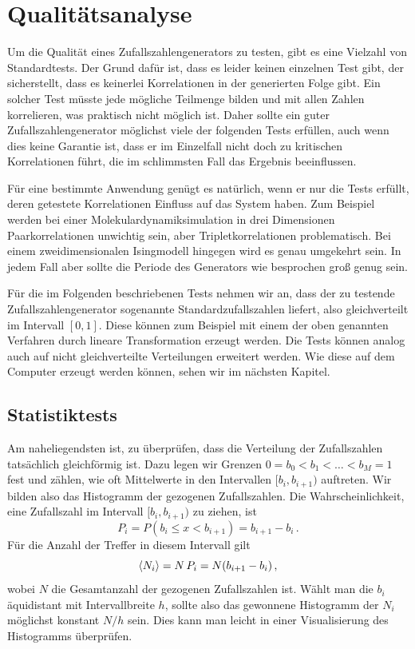 \section{Qualitätsanalyse}

Um die Qualität eines Zufallszahlengenerators zu testen, gibt es eine
Vielzahl von Standardtests. Der Grund dafür ist, dass es leider keinen
einzelnen Test gibt, der sicherstellt, dass es keinerlei Korrelationen
in der generierten Folge gibt. Ein solcher Test müsste jede mögliche
Teilmenge bilden und mit allen Zahlen korrelieren, was praktisch nicht
möglich ist. Daher sollte ein guter Zufallszahlengenerator möglichst
viele der folgenden Tests erfüllen, auch wenn dies keine Garantie ist,
dass er im Einzelfall nicht doch zu kritischen Korrelationen führt,
die im schlimmsten Fall das Ergebnis beeinflussen.

Für eine bestimmte Anwendung genügt es natürlich, wenn er nur die
Tests erfüllt, deren getestete Korrelationen Einfluss auf das System
haben. Zum Beispiel werden bei einer Molekulardynamiksimulation in
drei Dimensionen Paarkorrelationen unwichtig sein, aber
Tripletkorrelationen problematisch.  Bei einem zweidimensionalen
Isingmodell hingegen wird es genau umgekehrt sein.  In jedem Fall aber
sollte die Periode des Generators wie besprochen groß genug sein.

Für die im Folgenden beschriebenen Tests nehmen wir an, dass der zu
testende Zufallszahlengenerator sogenannte Standardzufallszahlen
liefert, also gleichverteilt im Intervall $[0,1]$. Diese können zum
Beispiel mit einem der oben genannten Verfahren durch lineare
Transformation erzeugt werden. Die Tests können analog auch auf nicht
gleichverteilte Verteilungen erweitert werden. Wie diese auf dem
Computer erzeugt werden können, sehen wir im nächsten Kapitel.

\subsection{Statistiktests}

Am naheliegendsten ist, zu überprüfen, dass die Verteilung der Zufallszahlen tatsächlich gleichförmig ist. Dazu legen wir Grenzen $0 = b_0 < b_1 < \ldots < b_M = 1$ fest und zählen, wie oft Mittelwerte in den Intervallen $[b_i,b_{i+1})$ auftreten. Wir bilden also das Histogramm der gezogenen Zufallszahlen. Die Wahrscheinlichkeit, eine Zufallszahl im Intervall $[b_i,b_{i+1})$ zu ziehen, ist
\begin{equation}
	P_i = P(b_i \le x < b_{i+1}) = b_{i+1} - b_i\,.
\end{equation}
Für die Anzahl der Treffer in diesem Intervall gilt
\begin{equation}
	\left\langle{N_i}\right\rangle = N\,P_i = N (b_{i+1} - b_i)\,,
\end{equation}
wobei $N$ die Gesamtanzahl der gezogenen Zufallszahlen ist. Wählt man die $b_i$ äquidistant mit Intervallbreite $h$, sollte also das gewonnene Histogramm der $N_i$ möglichst konstant $N/h$ sein. Dies kann man leicht in einer Visualisierung des Histogramms überprüfen.

